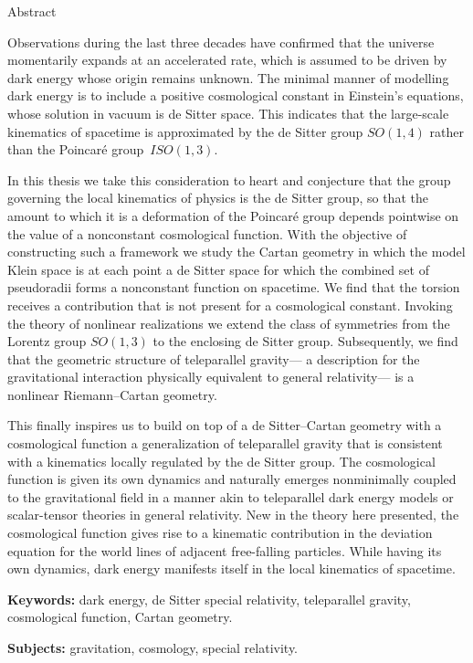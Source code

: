 {\large\selectfont%
\begin{center}Abstract\end{center}}

Observations during the last three decades have confirmed that
the universe momentarily expands at an accelerated rate, which is 
assumed to be driven by dark energy whose origin remains unknown.  
The minimal manner of modelling dark energy is to include 
a positive cosmological constant in Einstein's equations, whose 
solution in vacuum is de Sitter space. This indicates that the 
large-scale kinematics of spacetime is approximated by the de 
Sitter group $SO(1,4)$ rather than the Poincar\'e 
group~$ISO(1,3)$. 

In this thesis we take this consideration to heart and conjecture 
that the group governing the local kinematics of physics is the 
de Sitter group, so that the amount to which it is a deformation 
of the Poincar\'e group depends pointwise on the value of 
a nonconstant cosmological function. With the objective of 
constructing such a framework we study the Cartan geometry in 
which the model Klein space is at each point a de Sitter space 
for which the combined set of pseudoradii forms a nonconstant 
function on spacetime. We find that the torsion receives 
a contribution that is not present for a cosmological constant. 
Invoking the theory of nonlinear realizations we extend the class 
of symmetries from the Lorentz group $SO(1,3)$ to the enclosing 
de Sitter group. Subsequently, we find that the geometric 
structure of teleparallel gravity--- a description for the 
gravitational interaction physically equivalent to general 
relativity--- is a nonlinear Riemann--Cartan geometry.

This finally inspires us to build on top of a de Sitter--Cartan 
geometry with a cosmological function a generalization of 
teleparallel gravity that is consistent with a kinematics locally 
regulated by the de Sitter group. The cosmological function is 
given its own dynamics and naturally emerges nonminimally coupled 
to the gravitational field in a manner akin to teleparallel dark 
energy models or scalar-tensor theories in general relativity.  
New in the theory here presented, the cosmological function gives 
rise to a kinematic contribution in the deviation equation for 
the world lines of adjacent free-falling particles. While having 
its own dynamics, dark energy manifests itself in the local 
kinematics of spacetime.

\vspace{2\baselineskip}
\noindent
\textbf{Keywords:} dark energy, de Sitter special relativity, 
teleparallel gravity, cosmological function, Cartan geometry.

\vspace{\baselineskip}
\noindent
\textbf{Subjects:} gravitation, cosmology, special relativity.
